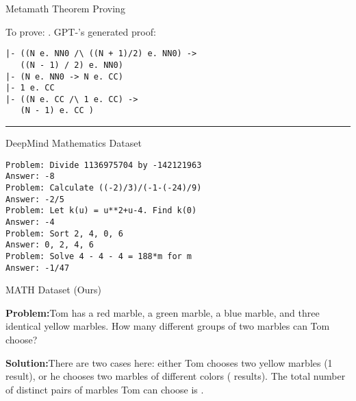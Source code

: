 \documentclass{article}
\begin{document}
\begin{figure*}[ht]
\vspace{-10pt}
\noindent
\begin{minipage}{0.515\textwidth}
\begin{center}
\large{Metamath Theorem Proving}
\end{center}
\begin{flushleft}
To prove: .
GPT-'s generated proof:
\begin{verbatim}
|- ((N e. NN0 /\ ((N + 1)/2) e. NN0) ->
   ((N - 1) / 2) e. NN0)
|- (N e. NN0 -> N e. CC)
|- 1 e. CC
|- ((N e. CC /\ 1 e. CC) ->
   (N - 1) e. CC )
\end{verbatim}
\vspace{-10pt}
\begin{center}

\end{center}

\hrule
\begin{center}
\large{DeepMind Mathematics Dataset}
\end{center}

\begin{verbatim}
Problem: Divide 1136975704 by -142121963
Answer: -8
Problem: Calculate ((-2)/3)/(-1-(-24)/9)
Answer: -2/5
Problem: Let k(u) = u**2+u-4. Find k(0)
Answer: -4
Problem: Sort 2, 4, 0, 6
Answer: 0, 2, 4, 6
Problem: Solve 4 - 4 - 4 = 188*m for m
Answer: -1/47
\end{verbatim}

\end{flushleft}
\end{minipage}\vline\phantom{v}\hfill \begin{minipage}{0.48\textwidth} 
\begin{flushleft}
\begin{center}
\large{MATH Dataset (Ours)}
\end{center}








\textbf{Problem:}\quad Tom has a red marble, a green marble, a blue marble, and three identical yellow marbles. How many different groups of two marbles can Tom choose?

\textbf{Solution:}\quad There are two cases here: either Tom chooses two yellow marbles (1 result), or he chooses two marbles of different colors ( results). The total number of distinct pairs of marbles Tom can choose is .




\end{flushleft}
\end{minipage}
\end{figure*}
\end{document}
